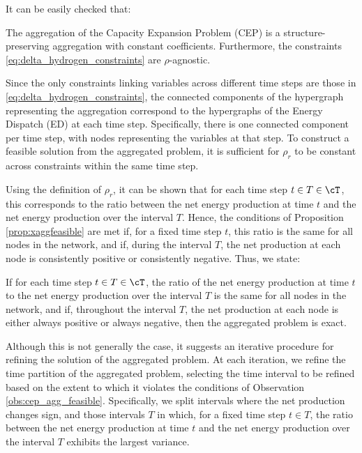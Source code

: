 \color{violet}


It can be easily checked that:

\begin{observation}
  The aggregation of the Capacity Expansion Problem (CEP) is a structure-preserving aggregation with constant coefficients. Furthermore, the constraints \eqref{eq:delta_hydrogen_constraints} are \(\rho\)-agnostic.
\end{observation}

Since the only constraints linking variables across different time steps are those in \eqref{eq:delta_hydrogen_constraints}, the connected components of the hypergraph representing the aggregation correspond to the hypergraphs of the Energy Dispatch (ED) at each time step. Specifically, there is one connected component per time step, with nodes representing the variables at that step. To construct a feasible solution from the aggregated problem, it is sufficient for \(\rho_r\) to be constant across constraints within the same time step.

Using the definition of \(\rho_r\), it can be shown that for each time step \(t \in T \in \cT\), this corresponds to the ratio between the net energy production at time \(t\) and the net energy production over the interval \(T\). Hence, the conditions of Proposition \ref{prop:xaggfeasible} are met if, for a fixed time step \(t\), this ratio is the same for all nodes in the network, and if, during the interval \(T\), the net production at each node is consistently positive or consistently negative. Thus, we state:

\begin{observation}
  \label{obs:cep_agg_feasible}
  If for each time step \(t \in T \in \cT\), the ratio of the net energy production at time \(t\) to the net energy production over the interval \(T\) is the same for all nodes in the network, and if, throughout the interval \(T\), the net production at each node is either always positive or always negative, then the aggregated problem is exact.
\end{observation}

Although this is not generally the case, it suggests an iterative procedure for refining the solution of the aggregated problem. At each iteration, we refine the time partition of the aggregated problem, selecting the time interval to be refined based on the extent to which it violates the conditions of Observation \ref{obs:cep_agg_feasible}. Specifically, we split intervals where the net production changes sign, and those intervals \(T\) in which, for a fixed time step \(t \in T\), the ratio between the net energy production at time \(t\) and the net energy production over the interval \(T\) exhibits the largest variance.


